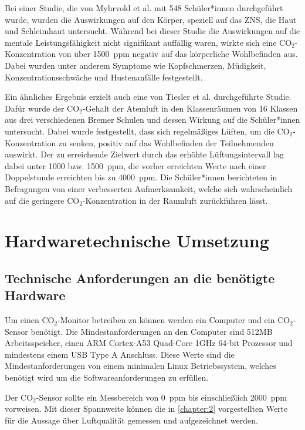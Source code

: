 \documentclass[a4paper,
    11pt,
    headings=small,
    ngerman,
    listof=totoc,
    numbers=noenddot]{scrreprt}[2021/11/13]
\begin{document}
Bei einer Studie, die von Myhrvold et al. \autocite{myhrvold} mit 548 Schüler*innen durchgeführt wurde, wurden die Auswirkungen auf den Körper, speziell auf das \ac{ZNS}, die Haut und Schleimhaut untersucht. Während bei dieser Studie die Auswirkungen auf die mentale Leistungsfähigkeit nicht signifikant auffällig waren, wirkte sich eine CO$_2$-Konzentration von über \SI{1500}{\ac{ppm}} negativ auf das körperliche Wohlbefinden aus. Dabei wurden unter anderem Symptome wie Kopfschmerzen, Müdigkeit, Konzentrationsschwäche und Hustenanfälle festgestellt.

Ein ähnliches Ergebnis erzielt auch eine von Tiesler et al. \autocite{tiesler} durchgeführte Studie. Dafür wurde der CO$_2$-Gehalt der Atemluft in den Klassenräumen von 16 Klassen aus drei verschiedenen Bremer Schulen und dessen Wirkung auf die Schüler*innen untersucht. Dabei wurde festgestellt, dass sich regelmäßiges Lüften, um die CO$_2$-Konzentration zu senken, positiv auf das Wohlbefinden der  Teilnehmenden auswirkt. Der zu erreichende Zielwert durch das erhöhte Lüftungsintervall lag dabei unter \si{1000} bzw. \SI{1500}{\ac{ppm}}, die vorher  erreichten Werte nach einer Doppelstunde erreichten bis zu \SI{4000}{\ac{ppm}}. Die Schüler*innen berichteten in Befragungen von einer verbesserten Aufmerksamkeit, welche sich wahrscheinlich auf die geringere CO$_2$-Konzentration in der Raumluft zurückführen lässt.


\chapter{Hardwaretechnische Umsetzung}


\section{Technische Anforderungen an die benötigte Hardware}

Um einen CO$_2$-Monitor betreiben zu können werden ein Computer und ein CO$_2$-Sensor benötigt. Die Mindestanforderungen an den Computer sind 512MB Arbeitsspeicher, einen ARM Cortex-A53 Quad-Core 1GHz 64-bit Prozessor und mindestens einem USB Type A Anschluss. Diese Werte sind die Mindestanforderungen von einem minimalen Linux Betriebssystem, welches benötigt wird um die Softwareanforderungen zu erfüllen.

Der CO$_2$-Sensor sollte ein Messbereich von \SI{0}{ppm} bis einschließlich \SI{2000}{ppm} vorweisen. Mit dieser Spannweite können die in \vref{chapter:2} vorgestellten Werte für die Aussage über Luftqualität gemessen und aufgezeichnet werden.
\end{document}
